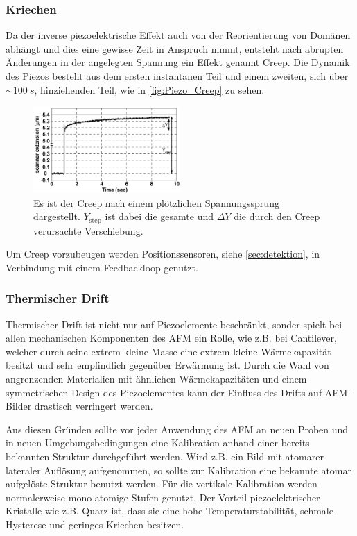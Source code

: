     \subsubsection*{Kriechen} \vspace*{-0.25cm}
        Da der inverse piezoelektrische Effekt auch von der Reorientierung von Domänen abhängt und dies eine gewisse Zeit in Anspruch nimmt, entsteht nach abrupten Änderungen in der angelegten Spannung ein Effekt genannt \glqq Creep\grqq.
        Die Dynamik des Piezos besteht aus dem ersten instantanen Teil und einem zweiten, sich über $\sim \SI{100}{s}$, hinziehenden Teil, wie in \autoref{fig:Piezo_Creep} zu sehen.
        \begin{figure}[ht]
            \centering\captionsetup{format=plain}
            \includegraphics[width=0.5\textwidth]{bilder/Piezo_Creep.png}
            \caption{Es ist der Creep nach einem plötzlichen Spannungssprung dargestellt. $Y_{\mathrm{step}}$ ist dabei die gesamte und $\Delta Y$ die durch den Creep verursachte Verschiebung.}
            \label{fig:Piezo_Creep}
        \end{figure}
        Um Creep vorzubeugen werden Positionssensoren, siehe \autoref{sec:detektion}, in Verbindung mit einem Feedbackloop genutzt.
        

    \subsubsection*{Thermischer Drift} \vspace*{-0.25cm}
        Thermischer Drift ist nicht nur auf Piezoelemente beschränkt, sonder spielt bei allen mechanischen Komponenten des AFM ein Rolle, wie z.B. bei Cantilever, welcher durch seine extrem kleine Masse eine extrem kleine Wärmekapazität besitzt und sehr empfindlich gegenüber Erwärmung ist.
        Durch die Wahl von angrenzenden Materialien mit ähnlichen Wärmekapazitäten und einem symmetrischen Design des Piezoelementes kann der Einfluss des Drifts auf AFM-Bilder drastisch verringert werden.
        
    \vspace*{0.5cm}
    Aus diesen Gründen sollte vor jeder Anwendung des AFM an neuen Proben und in neuen Umgebungsbedingungen eine Kalibration anhand einer bereits bekannten Struktur durchgeführt werden.
    Wird z.B. ein Bild mit atomarer lateraler Auflösung aufgenommen, so sollte zur Kalibration eine bekannte atomar aufgelöste Struktur benutzt werden.
    Für die vertikale Kalibration werden normalerweise mono-atomige Stufen genutzt.
    Der Vorteil piezoelektrischer Kristalle wie z.B. Quarz ist, dass sie eine hohe Temperaturstabilität, schmale Hysterese und geringes Kriechen besitzen.


